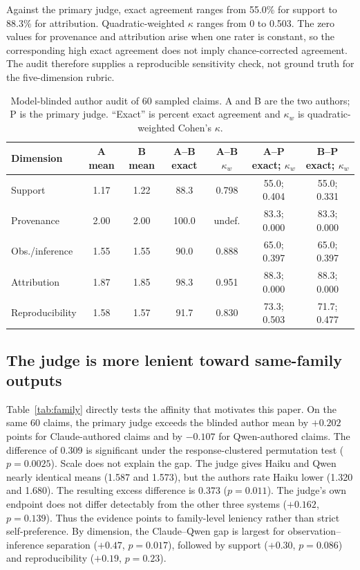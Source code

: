 \documentclass[conference]{IEEEtran}
\begin{document}
Against the primary judge, exact agreement ranges from 55.0\% for support to
88.3\% for attribution. Quadratic-weighted $\kappa$ ranges from 0 to 0.503.
The zero values for provenance and attribution arise when one rater is constant,
so the corresponding high exact agreement does not imply chance-corrected
agreement. The audit therefore supplies a reproducible sensitivity check, not
ground truth for the five-dimension rubric.

\begin{table}[t]
\centering
\caption{Model-blinded author audit of 60 sampled claims. A and B are the two
authors; P is the primary judge. ``Exact'' is percent exact agreement and
$\kappa_w$ is quadratic-weighted Cohen's $\kappa$.}
\label{tab:human}
\scriptsize
\begin{tabular}{lcccccc}
\toprule
Dimension & A mean & B mean & A--B exact & A--B $\kappa_w$ & A--P exact; $\kappa_w$ & B--P exact; $\kappa_w$ \\
\midrule
Support & 1.17 & 1.22 & 88.3 & 0.798 & 55.0; 0.404 & 55.0; 0.331 \\
Provenance & 2.00 & 2.00 & 100.0 & undef. & 83.3; 0.000 & 83.3; 0.000 \\
Obs./inference & 1.55 & 1.55 & 90.0 & 0.888 & 65.0; 0.397 & 65.0; 0.397 \\
Attribution & 1.87 & 1.85 & 98.3 & 0.951 & 88.3; 0.000 & 88.3; 0.000 \\
Reproducibility & 1.58 & 1.57 & 91.7 & 0.830 & 73.3; 0.503 & 71.7; 0.477 \\
\bottomrule
\end{tabular}
\end{table}

\subsection{The judge is more lenient toward same-family outputs}
Table~\ref{tab:family} directly tests the affinity that motivates this paper.
On the same 60 claims, the primary judge exceeds the blinded author mean by
$+0.202$ points for Claude-authored claims and by $-0.107$ for Qwen-authored
claims. The difference of 0.309 is significant under the response-clustered
permutation test ($p=0.0025$). Scale does not explain the gap. The judge gives
Haiku and Qwen nearly identical means (1.587 and 1.573), but the authors rate
Haiku lower (1.320 and 1.680). The resulting excess difference is 0.373
($p=0.011$). The judge's own endpoint does not differ detectably from the other
three systems ($+0.162$, $p=0.139$). Thus the evidence points to family-level
leniency rather than strict self-preference. By dimension, the Claude--Qwen gap
is largest for observation--inference separation ($+0.47$, $p=0.017$), followed
by support ($+0.30$, $p=0.086$) and reproducibility ($+0.19$, $p=0.23$).
\end{document}
